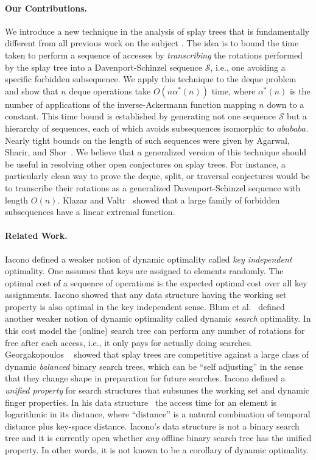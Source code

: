 \documentclass{article}
\newcommand{\Seq}{\mathscr{S}}
\begin{document}
\paragraph{Our Contributions.}
We introduce a new technique in the analysis of splay trees that is fundamentally
different from all previous work on the subject \cite{ST85,Tar85,Sundar92,ColeEtal00,Cole00,Georg04,Elmasry04b}.
The idea is to bound the time taken to perform a sequence of accesses by 
{\em transcribing} the rotations performed by the splay tree into a Davenport-Schinzel sequence $\Seq$, i.e.,
one avoiding a specific forbidden subsequence.  We apply this technique to the deque problem
and show that $n$ deque operations take $O(n\alpha^*(n))$ time, 
where $\alpha^*(n)$ is the number of applications of the inverse-Ackermann
function mapping $n$ down to a constant.  This time bound is established by generating 
not one sequence $\Seq$ but a hierarchy of sequences, each of which avoids subsequences isomorphic
to $abababa$.  Nearly tight bounds on the length of such sequences were given by 
Agarwal, Sharir, and Shor~\cite{ASS89}.  
We believe that a generalized version of this technique should be useful
in resolving other open conjectures on splay trees.  For instance, a particularly clean
way to prove the deque, split, or traversal conjectures would be to transcribe their
rotations as a generalized Davenport-Schinzel sequence with length $O(n)$.
Klazar and Valtr~\cite{KV94} showed that a large family of forbidden subsequences have
a linear extremal function.

\paragraph{Related Work.}
Iacono \cite{Iacono05} defined a weaker notion of dynamic optimality called {\em key independent} optimality.
One assumes that keys are assigned to elements randomly.  The optimal cost of a sequence of operations
is the expected optimal cost over all key assignments.  Iacono showed that any data structure having the
working set property is also optimal in the key independent sense.  
Blum et al.~\cite{BCK03} defined another weaker notion of dynamic optimality called dynamic {\em search} optimality.
In this cost model the (online) search tree can perform any number of rotations for free after each access, i.e.,
it only pays for actually doing searches.
Georgakopoulos ~\cite{Georg04}
showed that splay trees are competitive against a large class of dynamic {\em balanced} binary search trees,
which can be ``self adjusting'' in the sense that they change shape in preparation for future searches.
Iacono defined a {\em unified property} for search structures that subsumes the working set and dynamic finger
properties.  In his data structure~\cite{Iacono01} the access time for an element is logarithmic in its distance, 
where ``distance'' is a natural combination of temporal distance plus key-space distance.  Iacono's data structure \cite{Iacono01}
is not a binary search tree and it is currently open whether {\em any} offline binary search tree has the unified property.
In other words, it is not known to be a corollary of dynamic optimality.
\end{document}
